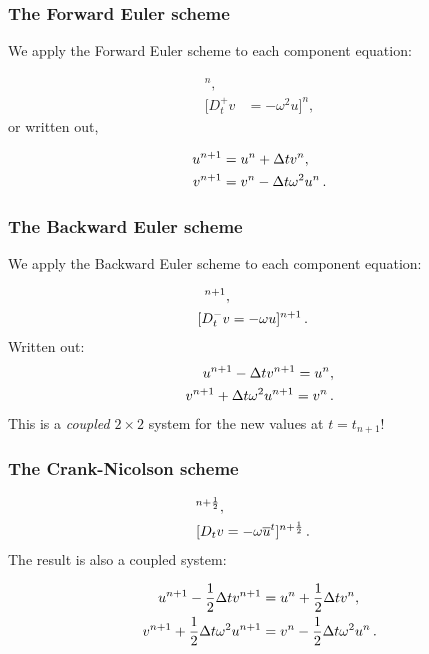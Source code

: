 \documentclass{beamer}
\begin{document}
\begin{frame}
\frametitle{The Forward Euler scheme}

We apply the Forward Euler scheme to each component equation:

\begin{align*}
[D_t^+ u &= v]^n,\\ 
[D_t^+ v &= -\omega^2 u]^n,
\end{align*}
or written out,

\begin{align}
u^{n+1} &= u^n + \Delta t v^n,\\ 
v^{n+1} &= v^n -\Delta t \omega^2 u^n
\tp
\end{align}
\end{frame}

\begin{frame}
\frametitle{The Backward Euler scheme}

We apply the Backward Euler scheme to each component equation:

\begin{align}
 [D_t^- u &= v]^{n+1},\\ 
 [D_t^- v &= -\omega u]^{n+1} \tp
\end{align}
Written out:
\begin{align}
u^{n+1} - \Delta t v^{n+1} = u^{n},\\ 
v^{n+1} + \Delta t \omega^2 u^{n+1} = v^{n}
\tp
\end{align}
This is a \emph{coupled} $2\times 2$ system for the new values at $t=t_{n+1}$!
\end{frame}

\begin{frame}
\frametitle{The Crank-Nicolson scheme}

\begin{align}
[D_t u &= \overline{v}^t]^{n+\half},\\ 
[D_t v &= -\omega \overline{u}^t]^{n+\half}
\tp
\end{align}
The result is also a coupled system:

\begin{align}
u^{n+1} - \half\Delta t v^{n+1} &= u^{n} + \half\Delta t v^{n},\\ 
v^{n+1} + \half\Delta t \omega^2 u^{n+1} &= v^{n}
- \half\Delta t \omega^2 u^{n}
\tp
\end{align}
\end{frame}
\end{document}
